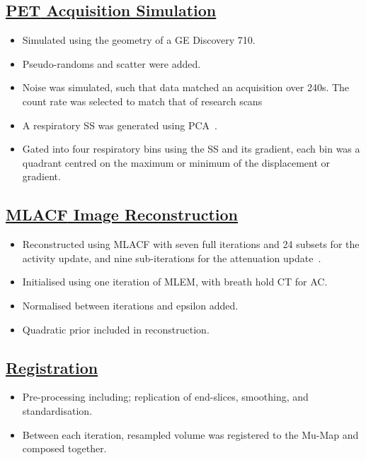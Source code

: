 \documentclass[portrait, color=UCLburgundy, margin=1cm]{uclposter}
\begin{document}
\begin{multicols}{3}
            \subsection*{\underline{\textbf{\acrshort{PET} Acquisition Simulation}}}
                \begin{itemize}
                    \item Simulated using the geometry of a \gls{GE} Discovery 710.
                    \item Pseudo-randoms and scatter were added.
                    \item Noise was simulated, such that data matched an acquisition over 240s. The count rate was selected to match that of research scans
                    \item A respiratory \gls{SS} was generated using \gls{PCA}~\cite{Thielemans2011}.
                    \item Gated into four respiratory bins using the \gls{SS} and its gradient, each bin was a quadrant centred on the maximum or minimum of the displacement or gradient.
                \end{itemize}
            
            \subsection*{\underline{\textbf{\acrshort{MLACF} Image Reconstruction}}}
                \begin{itemize}
                    \item Reconstructed using \acrshort{MLACF} with seven full iterations and 24 subsets for the activity update, and nine sub-iterations for the attenuation update~\cite{Nuyts2012ML-reconstructionFactors}.
                    \item Initialised using one iteration of \acrshort{MLEM}, with breath hold \acrshort{CT} for \gls{AC}.
                    \item Normalised between iterations and epsilon added.
                    \item Quadratic prior included in reconstruction.
                \end{itemize}
            
            \subsection*{\underline{\textbf{Registration}}}
                \begin{itemize}
                    \item Pre-processing including; replication of end-slices, smoothing, and standardisation.
                    \item Between each iteration, resampled volume was registered to the \gls{Mu-Map} and  composed together.
                \end{itemize}
            

\end{multicols}
\end{document}
